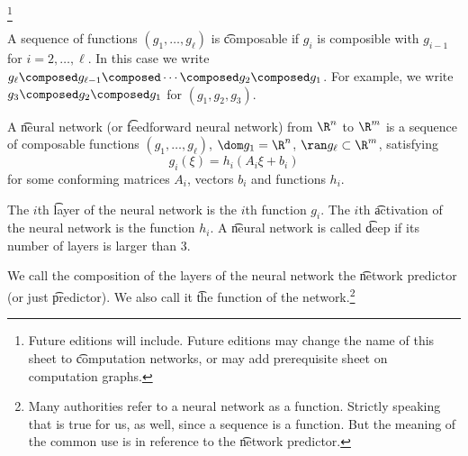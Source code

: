 
\footnote{Future editions will include. Future editions may change the name of this sheet to \t{computation networks}, or may add prerequisite sheet on computation graphs.}


A sequence of functions $(g_1, \dots, g_\ell)$ is \t{composable} if $g_i$ is composible with $g_{i-1}$ for $i = 2, \dots, \ell$.
In this case we write $g_\ell \composed g_{\ell-1} \composed \cdots \composed g_2 \composed g_1$. For example, we write $g_3 \composed g_2 \composed g_1$ for $(g_1, g_2, g_3)$.

A \t{neural network} (or \t{feedforward neural network}) from $\R^n$ to $\R^m$ is a sequence of composable functions $(g_1, \dots, g_{\ell})$, $\dom g_1 = \R^n$, $\ran g_\ell \subset \R^m$, satisfying
\[
  g_i(\xi) = h_i(A_i \xi + b_i)
\]
for some conforming matrices $A_i$, vectors $b_i$ and functions $h_i$.

The $i$th \t{layer} of the neural network is the $i$th function $g_i$.
The $i$th \t{activation} of the neural network is the function $h_i$.
A \t{neural network} is called \t{deep} if its number of layers is larger than 3.

We call the composition of the layers of the neural network the \t{network predictor} (or just \t{predictor}).
We also call it \t{the function} of the network.\footnote{Many authorities refer to a neural network as a function. Strictly speaking that is true for us, as well, since a sequence is a function. But the meaning of the common use is in reference to the \t{network predictor}.}


%
%
%

\blankpage
